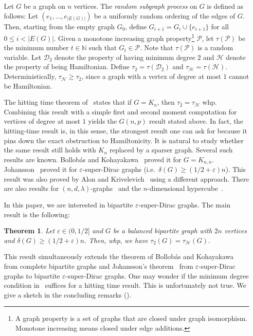 \documentclass[reqno,final,a4paper]{amsart}
\numberwithin{equation}{section}
\newtheorem{theorem}{Theorem}[section]
\theoremstyle{definition}
\theoremstyle{remark}
\newcommand{\N}{\mathbb{N}}
\newcommand{\eps}{\varepsilon}
\def\calD{\mathcal{D}}
\def\calH{\mathcal{H}}
\def\calP{\mathcal{P}}
\begin{document}
Let $G$ be a graph on $n$ vertices. The \emph{random subgraph process} on $G$ is defined as follows: Let $(e_1,\dots, e_{|E(G)|})$ be a uniformly random ordering of the edges of $G$. Then, starting from the empty graph $G_0$, define $G_{i+1} = G_i \cup \{e_{i+1}\}$ for all $0\leq i< |E(G)|$. 
Given a monotone increasing graph property\footnote{A graph property is a set of graphs that are closed under graph isomorphism. Monotone increasing means closed under edge additions.}
$\calP$, let $\tau(\calP)$ be the minimum number $t\in \N$ such that $G_t\in \calP$. Note that $\tau(\calP)$ is a random variable.
Let $\calD_2$ denote the property of having minimum degree $2$ and $\calH$ denote the property of being Hamiltonian. Define $\tau_2 = \tau(\calD_2)$ and $\tau_\calH = \tau(\calH)$. Deterministically, $\tau_\calH\geq \tau_2$, since a graph with a vertex of degree at most $1$ cannot be Hamiltonian.

The hitting time theorem of~\cite{Ajtai-Komlos-Szemeredi, Bollobas} states that if $G= K_n$, then $\tau_2 = \tau_{\calH}$ whp.
Combining this result with a simple first and second moment computation for vertices of degree at most $1$ yields the $G(n,p)$ result stated above. In fact, the hitting-time result is, in this sense, the strongest result one can ask for because it pins down the exact obstruction to Hamiltonicity. 
It is natural to study whether the same result still holds with $K_n$ replaced by a sparser graph. Several such results are known.
Bollob\'{a}s and Kohayakawa~\cite{Bollobas-Kohayakawa} proved it for $G = K_{n,n}$. Johansson~\cite{Johansson} proved it for $\eps$-super-Dirac graphs (i.e.\ $\delta(G)\geq (1/2+\eps)n$). This result was also proved by Alon and Krivelevich~\cite{Alon-Krivelevich} using a different approach. There are also results for $(n,d,\lambda)$-graphs~\cite{Frieze-Krivelevich, Alon-Krivelevich, Chen-Chen-Im-Wang} and the $n$-dimensional hypercube~\cite{Condon-Espuny-Girao-Kuhn-Osthus}.

In this paper, we are interested in bipartite $\eps$-super-Dirac graphs. 
The main result is the following:
\begin{theorem}\label{thm:main}
    Let $\eps \in (0,1/2]$ and $G$ be a balanced bipartite graph with $2n$ vertices and $\delta(G) \geq (1/2 + \eps)n$. Then, whp, we have $\tau_2(G) = \tau_\calH(G)$.
\end{theorem}
This result simultaneously extends the theorem of Bollob\'{a}s and Kohayakawa~\cite{Bollobas-Kohayakawa} from complete bipartite graphs and Johansson's theorem~\cite{Johansson} from $\eps$-super-Dirac graphs to bipartite $\eps$-super-Dirac graphs.
One may wonder if the minimum degree condition in~ suffices for a hitting time result. This is unfortunately not true. We give a sketch in the concluding remarks ().
\end{document}
